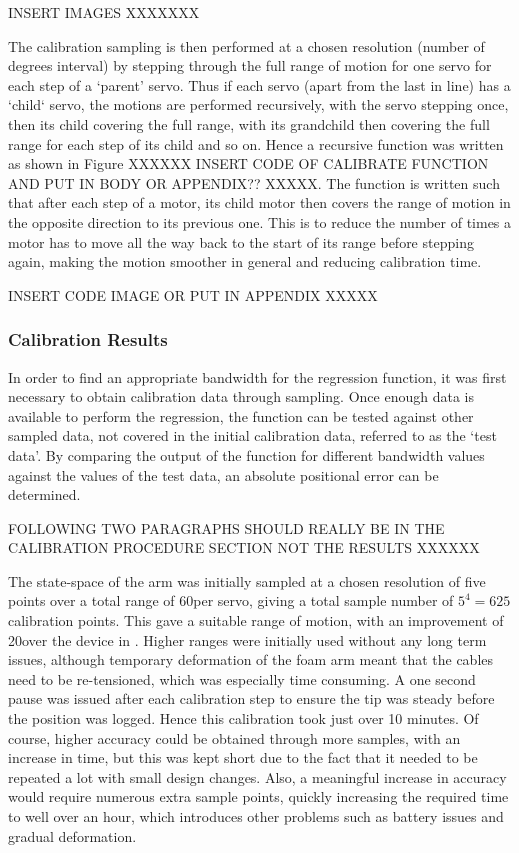 \documentclass[11pt]{article}
\begin{document}
INSERT IMAGES XXXXXXX


The calibration sampling is then performed at a chosen resolution (number of degrees interval) by stepping through the full range of motion for one servo for each step of a `parent' servo. Thus if each servo (apart from the last in line) has a `child` servo, the motions are performed recursively, with the servo stepping once, then its child covering the full range, with its grandchild then covering the full range for each step of its child and so on. Hence a recursive function was written as shown in Figure XXXXXX INSERT CODE OF CALIBRATE FUNCTION AND PUT IN BODY OR APPENDIX?? XXXXX. The function is written such that after each step of a motor, its child motor then covers the range of motion in the opposite direction to its previous one. This is to reduce the number of times a motor has to move all the way back to the start of its range before stepping again, making the motion smoother in general and reducing calibration time. 

INSERT CODE IMAGE OR PUT IN APPENDIX XXXXX	


\subsubsection{Calibration Results}
In order to find an appropriate bandwidth for the regression function, it was first necessary to obtain calibration data through sampling. Once enough data is available to perform the regression, the function can be tested against other sampled data, not covered in the initial calibration data, referred to as the `test data'. By comparing the output of the function for different bandwidth values against the values of the test data, an absolute positional error can be determined. 

FOLLOWING TWO PARAGRAPHS SHOULD REALLY BE IN THE CALIBRATION PROCEDURE SECTION NOT THE RESULTS XXXXXX

The state-space of the arm was initially sampled at a chosen resolution of five points over a total range of 60\degree per servo, giving a total sample number of $5^4 = 625$ calibration points. This gave a suitable range of motion, with an improvement of 20\degree over the device in \cite{GreggSmithDesign}. Higher ranges were initially used without any long term issues, although temporary deformation of the foam arm meant that the cables need to be re-tensioned, which was especially time consuming. A one second pause was issued after each calibration step to ensure the tip was steady before the position was logged. Hence this calibration took just over 10 minutes. Of course, higher accuracy could be obtained through more samples, with an increase in time, but this was kept short due to the fact that it needed to be repeated a lot with small design changes. Also, a meaningful increase in accuracy would require numerous extra sample points, quickly increasing the required time to well over an hour, which introduces other problems such as battery issues and gradual deformation. 
\end{document}
